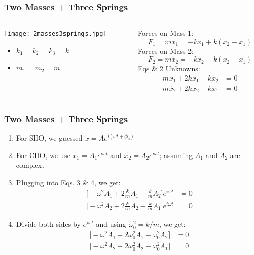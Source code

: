 \documentclass[pdf,handout, hideothersubsections]{beamer}
\begin{document}
\begin{frame}
\frametitle{Two Masses + Three Springs}
\begin{columns}

  \begin{column}{0.5\textwidth}
\pause
    \texttt{[image: 2masses3springs.jpg]}
\begin{itemize}
\item $k_1 = k_2 = k_3 = k$
\item $m_1 = m_2 = m$
\end{itemize}
  \end{column}

  \begin{column}{0.5\textwidth}
    \pause
    Forces on Mass 1:
    \begin{equation}
      F_1 = m \ddot{x_1} = -k x_1 + k (x_2 - x_1)
    \end{equation}
    \pause
    Forces on Mass 2:
    \begin{equation}
      F_2 = m \ddot{x_2} = -k x_2 - k (x_2 - x_1)
    \end{equation}
     Eqs \& 2 Unknowns:
    \begin{align}
      m \ddot{x_1} + 2 k x_1 - k x_2 &= 0 \\
      m \ddot{x_2} + 2 k x_2 - k x_1 &= 0
    \end{align}
  \end{column}

\end{columns}
\end{frame}



\begin{frame}
\frametitle{Two Masses + Three Springs}
    \pause
\begin{enumerate}
\item For SHO, we guessed $\tilde{x} = A e^{i (\omega t + \phi_0)}$
\pause
\item For CHO, we use $\tilde{x_1} = A_1 e^{i \omega t}$ and
  $\tilde{x_2} = A_2 e^{i \omega t}$; assuming $A_1$ and $A_2$ are complex.
\pause
\item Plugging into Eqs. 3 \& 4, we get: \\
\begin{align*}
\Big[ -\omega^2 A_1 + 2 \frac{k}{m}A_1 - \frac{k}{m}A_2 \Big] e^{i
  \omega t} &= 0 \\
\Big[ -\omega^2 A_2 + 2 \frac{k}{m}A_2 - \frac{k}{m}A_1 \Big] e^{i
  \omega t} &= 0
\end{align*}
\pause
\item Divide both sides by $e^{i \omega t}$ and using $\omega_0^2 =
  k/m$, we get:
\pause
\begin{align*}
\Big[ -\omega^2 A_1 + 2 \omega_0^2 A_1 - \omega_0^2 A_2 \Big] &= 0 \\
\Big[ -\omega^2 A_2 + 2 \omega_0^2 A_2 - \omega_0^2 A_1 \Big] &= 0
\end{align*}

\end{enumerate}
\end{frame}
\end{document}
